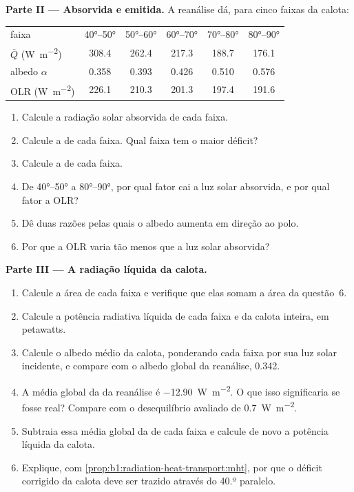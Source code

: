 \begin{problem}
\medskip
\noindent\textbf{Parte II --- Absorvida e emitida.} A reanálise dá, para cinco faixas da calota:
\begin{center}
\small
\begin{tabular}{|l|ccccc|}
\hline
faixa & \ang{40}--\ang{50} & \ang{50}--\ang{60} & \ang{60}--\ang{70} & \ang{70}--\ang{80} & \ang{80}--\ang{90} \\
$\bar Q$ (\unit{W.m^{-2}}) & 308.4 & 262.4 & 217.3 & 188.7 & 176.1 \\
albedo $\alpha$ & 0.358 & 0.393 & 0.426 & 0.510 & 0.576 \\
OLR (\unit{W.m^{-2}}) & 226.1 & 210.3 & 201.3 & 197.4 & 191.6 \\
\hline
\end{tabular}
\end{center}
\begin{enumerate}[resume]
  \item Calcule a radiação solar absorvida de cada faixa.
  \item Calcule a  de cada faixa. Qual faixa tem o maior déficit?
  \item Calcule a  de cada faixa.
  \item De \ang{40}--\ang{50} a \ang{80}--\ang{90}, por qual fator cai a luz solar absorvida, e por
        qual fator a OLR?
  \item Dê duas razões pelas quais o albedo aumenta em direção ao polo.
  \item Por que a OLR varia tão menos que a luz solar absorvida?
\end{enumerate}

\medskip
\noindent\textbf{Parte III --- A radiação líquida da calota.}
\begin{enumerate}[resume]
  \item Calcule a área de cada faixa e verifique que elas somam a área da questão~6.
  \item Calcule a potência radiativa líquida de cada faixa e da calota inteira, em petawatts.
  \item Calcule o albedo médio da calota, ponderando cada faixa por sua luz solar incidente, e
        compare com o albedo global da reanálise, \num{0.342}.
  \item A média global da  da reanálise é \qty{-12.90}{W.m^{-2}}. O que isso
        significaria se fosse real? Compare com o desequilíbrio avaliado de \qty{+0.7}{W.m^{-2}}.
  \item Subtraia essa média global da  de cada faixa e calcule de novo a potência
        líquida da calota.
  \item Explique, com \cref{prop:b1:radiation-heat-transport:mht}, por que o déficit corrigido da
        calota deve ser trazido através do 40.º paralelo.
\end{enumerate}


\end{problem}
